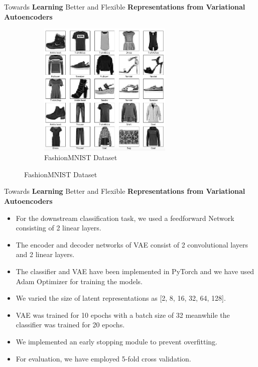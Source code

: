 \documentclass[hyperref={colorlinks,citecolor=blue,linkcolor=blue,urlcolor=blue}]{beamer}
\begin{document}
\begin{frame}{ Towards \textbf{Learning} Better and Flexible \textbf{Representations from Variational Autoencoders} \vspace{0.3em}}
\begin{itemize}
\begin{figure}
\begin{subfigure}[b]{0.4\textwidth}
          \includegraphics[width=0.7\textwidth]{./Images/FashionMNIST.png}
          \caption{FashionMNIST Dataset}
      \end{subfigure}
    \end{figure}
  \end{itemize}
\end{frame}

\begin{frame}{ Towards \textbf{Learning} Better and Flexible \textbf{Representations from Variational Autoencoders} \vspace{0.3em}}
  \begin{itemize}
    \item For the downstream classification task, we used a feedforward Network consisting of 2 linear layers.
    \item The encoder and decoder networks of VAE consist of 2 convolutional layers and 2 linear layers.
    \item The classifier and VAE have been implemented in PyTorch and we have used Adam Optimizer for training the models.
    \item We varied the size of latent representations as [2, 8, 16, 32, 64, 128].
    \item VAE was trained for 10 epochs with a batch size of 32 meanwhile the classifier was trained for 20 epochs.
    \item We implemented an early stopping module to prevent overfitting.
    \item For evaluation, we have employed 5-fold cross validation.
  \end{itemize}
\end{frame}
\end{document}

